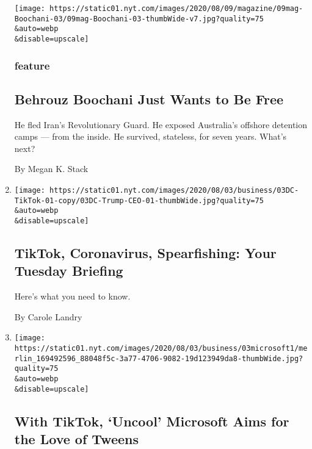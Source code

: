 \begin{enumerate}
  \texttt{[image: https://static01.nyt.com/images/2020/08/09/magazine/09mag-Boochani-03/09mag-Boochani-03-thumbWide-v7.jpg?quality=75\\\&auto=webp\\\&disable=upscale]}

  \hypertarget{feature}{%
  \subsubsection{feature}\label{feature}}

  \hypertarget{behrouz-boochani-just-wants-to-be-free}{%
  \subsection{Behrouz Boochani Just Wants to Be
  Free}\label{behrouz-boochani-just-wants-to-be-free}}

  He fled Iran's Revolutionary Guard. He exposed Australia's offshore
  detention camps --- from the inside. He survived, stateless, for seven
  years. What's next?

  By Megan K. Stack
\item
  \href{/2020/08/03/briefing/coronavirus-tiktok-afghanistan-australia.html}{}

  \texttt{[image: https://static01.nyt.com/images/2020/08/03/business/03DC-TikTok-01-copy/03DC-Trump-CEO-01-thumbWide.jpg?quality=75\\\&auto=webp\\\&disable=upscale]}

  \hypertarget{tiktok-coronavirus-spearfishing-your-tuesday-briefing}{%
  \subsection{TikTok, Coronavirus, Spearfishing: Your Tuesday
  Briefing}\label{tiktok-coronavirus-spearfishing-your-tuesday-briefing}}

  Here's what you need to know.

  By Carole Landry
\item
  \href{/2020/08/03/technology/tiktok-microsoft-tweens.html}{}

  \texttt{[image: https://static01.nyt.com/images/2020/08/03/business/03microsoft1/merlin\_169492596\_88048f5c-3a77-4706-9082-19d123949da8-thumbWide.jpg?quality=75\\\&auto=webp\\\&disable=upscale]}

  \hypertarget{with-tiktok-uncool-microsoft-aims-for-the-love-of-tweens}{%
  \subsection{With TikTok, `Uncool' Microsoft Aims for the Love of
  Tweens}\label{with-tiktok-uncool-microsoft-aims-for-the-love-of-tweens}}


\end{enumerate}
